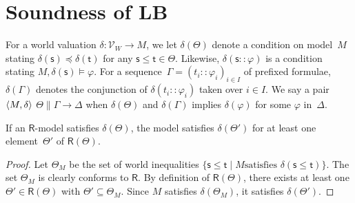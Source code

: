   \section{Soundness of LB}

  For a world valuation $\delta:\mathcal V_W\longrightarrow M$,
  we let $\delta(\Theta)$ denote a condition on
  model~$M$ stating $\delta(\mathsf s)\preceq \delta(\mathsf t)$ for any
  $\mathsf s\le \mathsf t\in\Theta$.
  Likewise, $\delta(\mathsf s::\varphi)$ is a condition stating
  $M,\delta(\mathsf s)\models\varphi$.  For a sequence~$\Gamma =
  (t_i::\varphi_i)_{i\in I}$ of
  prefixed formulae, $\delta(\Gamma)$ denotes the conjunction
  of $\delta(t_i::\varphi_i)$ taken over $i\in I$.
   We say a pair
   $\langle{M,\delta}\rangle$ 
   $\Theta\parallel\Gamma\longrightarrow\Delta$ when $\delta(\Theta)$ and
   $\delta(\Gamma)$ implies $\delta(\varphi)$ for some $\varphi$
   in~$\Delta$.

   \begin{proposition}
    \label{exp-sound}
    If an $\mathsf R$-model satisfies $\delta(\Theta)$,
    the model satisfies $\delta(\Theta')$ for
    at least one element~$\Theta'$ of $\mathsf R(\Theta)$.
   \end{proposition}
   \begin{proof}
    Let $\Theta_M$ be the set of world inequalities
    $\{\mathsf s\le \mathsf t\mid M\mbox{
    satisfies }\delta(\mathsf s\le \mathsf t)\}$.
    The set $\Theta_M$ is clearly conforms to $\mathsf R$.
    By definition of $\mathsf R(\Theta)$, there exists at least one $\Theta'\in
    \mathsf R(\Theta)$ with $\Theta'\subseteq \Theta_M$.
    Since $M$ satisfies $\delta(\Theta_M)$, it satisfies $\delta(\Theta')$.
   \end{proof}

